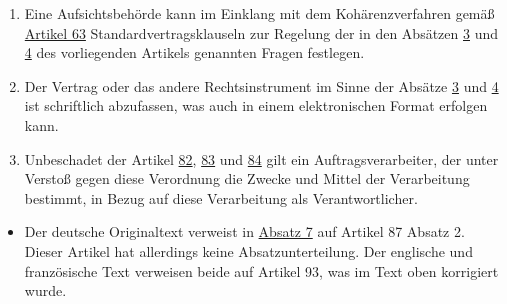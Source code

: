 \begin{enumerate}
  \item Eine Aufsichtsbehörde kann im Einklang mit dem Kohärenzverfahren gemäß \hyperref[ch:63]{Artikel 63}
   Standardvertragsklauseln zur Regelung der in den Absätzen \hyperref[itm:28-3-1]{3} und \hyperref[itm:28-4]{4} des
   vorliegenden Artikels genannten Fragen festlegen.
  \label{itm:28-8}

  \item Der Vertrag oder das andere Rechtsinstrument im Sinne der Absätze \hyperref[itm:28-3-1]{3} und \hyperref
  [itm:28-4]
   {4} ist schriftlich abzufassen, was auch in einem elektronischen Format erfolgen kann.
  \label{itm:28-9}

  \item Unbeschadet der Artikel \hyperref[ch:82]{82}, \hyperref[ch:83]{83} und \hyperref[ch:84]{84} gilt ein
   Auftragsverarbeiter, der unter Verstoß gegen diese Verordnung die Zwecke und Mittel der Verarbeitung bestimmt, in
   Bezug auf diese Verarbeitung als Verantwortlicher.
  \label{itm:28-10}

\end{enumerate}


\begin{itemize}

  \item Der deutsche Originaltext verweist in \hyperref[itm:28-7]{Absatz 7} auf Artikel 87 Absatz 2. Dieser Artikel hat
  allerdings keine Absatzunterteilung. Der englische und französische Text verweisen beide auf Artikel 93, was im Text
  oben korrigiert wurde.

\end{itemize}

